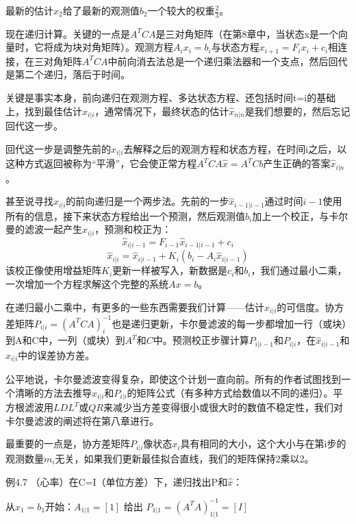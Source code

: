 	最新的估计$\hat{x}_2$给了最新的观测值$b_2$一个较大的权重$\frac{2}{3}$。
	
	现在递归计算。关键的一点是$A^TCA$是三对角矩阵（在第8章中，当状态x是一个向量时，它将成为块对角矩阵）。观测方程$A_ix_i=b_i$与状态方程$x_{i+1}=F_ix_i+c_i$相连接，在三对角矩阵$A^TCA$中前向消去法总是一个递归乘法器和一个支点，然后回代是第二个递归，落后于时间。
	
	关键是事实本身，前向递归在观测方程、多达状态方程、还包括时间t=i的基础上，找到最佳估计$\hat{x}_{i|i}$，通常情况下，最终状态的估计$\hat{x}_{n|n}$是我们想要的，然后忘记回代这一步。
	
	回代这一步是调整先前的$\hat{x}_{i|i}$去解释之后的观测方程和状态方程，在时间i之后，以这种方式返回被称为“平滑”，它会使正常方程$A^TCA\hat{x}=A^TCb$产生正确的答案$\hat{x}_{i|n}$。
	
	甚至说寻找$\hat{x}_{i|i}$的前向递归是一个两步法。先前的一步$\hat{x}_{i-1|i-1}$通过时间$i-1$使用所有的信息，接下来状态方程给出一个预测，然后观测值$b_i$加上一个校正，与卡尔曼的滤波一起产生$\hat{x}_{i|i}$，预测和校正为：
	\begin{equation*}
	\hat{x}_{i|i-1}=F_{i-1}\hat{x}_{i-1|i-1}+c_i
	\end{equation*}
	\begin{equation*}
	\hat{x}_{i|i}=\hat{x}_{i|i-1}+K_i(b_i-A_i\hat{x}_{i|i-1})
	\end{equation*}
	该校正像使用增益矩阵$K_i$更新一样被写入，新数据是$c_i$和$b_i$，我们通过最小二乘，一次增加一个方程求解这个完整的系统$Ax=b$。
	
	在递归最小二乘中，有更多的一些东西需要我们计算——估计$\hat{x}_{i|i}$的可信度。协方差矩阵$P_{i|i}=(A^TCA)^{-1}_i$也是递归更新，卡尔曼滤波的每一步都增加一行（或块）到A和C中，一列（或块）到$A^T$和$C$中。预测校正步骤计算$P_{i|i-1}$和$P_{i|i}$，在$\hat{x}_{i|i-1}$和$\hat{x}_{i|i}$中的误差协方差。
	
	公平地说，卡尔曼滤波变得复杂，即使这个计划一直向前。所有的作者试图找到一个清晰的方法去推导$\hat{x}_{i|i}$和$P_{i|i}$的矩阵公式（有多种方式给数值以不同的递归）。平方根滤波用$LDL^T$或$QR$来减少当方差变得很小或很大时的数值不稳定性，我们对卡尔曼滤波的阐述将在第八章进行。
	
	最重要的一点是，协方差矩阵$P_{i|i}$像状态$x_i$具有相同的大小，这个大小与在第i步的观测数量$m_i$无关，如果我们更新最佳拟合直线，我们的矩阵保持2乘以2。
	
	例4.7 \quad （心率）在C=I（单位方差）下，递归找出P和$\hat{x}$：
	
	从$x_1=b_1$开始：\quad\quad  $A_{1|1}=[1]$  给出 $P_{1|1}=(A^TA)^{-1}_{1|1}=[I]$

